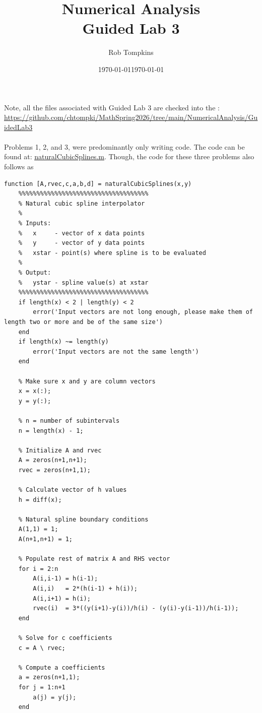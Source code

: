 \documentclass[12pt]{amsart}
\title{Numerical Analysis\\Guided Lab 3}
\author{Rob Tompkins}
\date{\today}
\begin{document}
    \maketitle
    \date{\today}
    \begin{onehalfspace}
        Note, all the files associated with Guided Lab 3 are checked into the : \\
        \underline{https://github.com/chtompki/MathSpring2026/tree/main/NumericalAnalysis/GuidedLab3}\\
\quad\\
        Problems 1, 2, and 3, were predominantly only writing code. The code can be found at:
        \underline{\href{https://github.com/chtompki/MathSpring2026/tree/main/NumericalAnalysis/GuidedLab3/naturalCubicSplines.m}{naturalCubicSplines.m}}.
        Though, the code for these three problems also follows as
        \begin{tiny}
        \begin{verbatim}
function [A,rvec,c,a,b,d] = naturalCubicSplines(x,y)
    %%%%%%%%%%%%%%%%%%%%%%%%%%%%%%%%%%%%
    % Natural cubic spline interpolator
    %
    % Inputs:
    %   x     - vector of x data points
    %   y     - vector of y data points
    %   xstar - point(s) where spline is to be evaluated
    %
    % Output:
    %   ystar - spline value(s) at xstar
    %%%%%%%%%%%%%%%%%%%%%%%%%%%%%%%%%%%%
    if length(x) < 2 | length(y) < 2
        error('Input vectors are not long enough, please make them of length two or more and be of the same size')
    end
    if length(x) ~= length(y)
        error('Input vectors are not the same length')
    end

    % Make sure x and y are column vectors
    x = x(:);
    y = y(:);

    % n = number of subintervals
    n = length(x) - 1;

    % Initialize A and rvec
    A = zeros(n+1,n+1);
    rvec = zeros(n+1,1);

    % Calculate vector of h values
    h = diff(x);

    % Natural spline boundary conditions
    A(1,1) = 1;
    A(n+1,n+1) = 1;

    % Populate rest of matrix A and RHS vector
    for i = 2:n
        A(i,i-1) = h(i-1);
        A(i,i)   = 2*(h(i-1) + h(i));
        A(i,i+1) = h(i);
        rvec(i)  = 3*((y(i+1)-y(i))/h(i) - (y(i)-y(i-1))/h(i-1));
    end

    % Solve for c coefficients
    c = A \ rvec;

    % Compute a coefficients
    a = zeros(n+1,1);
    for j = 1:n+1
        a(j) = y(j);
    end


\end{verbatim}
\end{tiny}
\end{onehalfspace}
\end{document}
